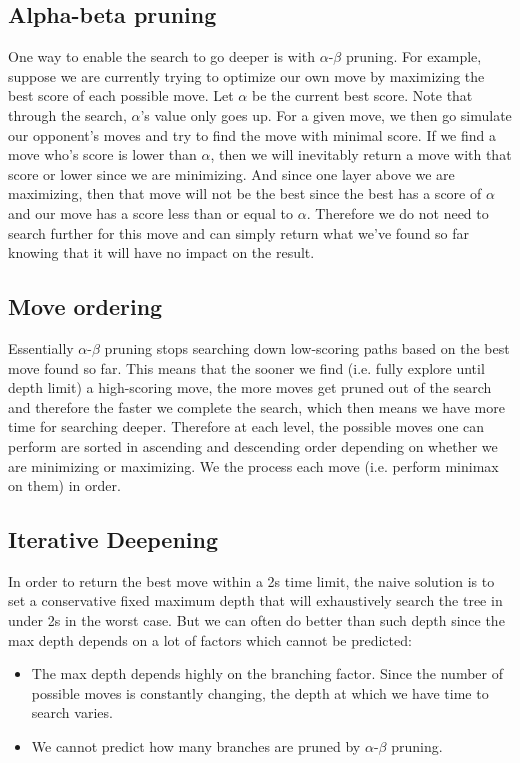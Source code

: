 \documentclass{article}
\begin{document}
\subsection{Alpha-beta pruning}
One way to enable the search to go deeper is with $\alpha$-$\beta$ pruning. For example, suppose we are currently trying to optimize our own move by maximizing the best score of each possible move. Let $\alpha$ be the current best score. Note that through the search, $\alpha$'s value only goes up. For a given move, we then go simulate our opponent's moves and try to find the move with minimal score. If we find a move who's score is lower than $\alpha$, then we will inevitably return a move with that score or lower since we are minimizing. And since one layer above we are maximizing, then that move will not be the best since the best has a score of $\alpha$ and our move has a score less than or equal to $\alpha$. Therefore we do not need to search further for this move and can simply return what we've found so far knowing that it will have no impact on the result.

\subsection{Move ordering}
Essentially $\alpha$-$\beta$ pruning stops searching down low-scoring paths based on the best move found so far. This means that the sooner we find (i.e. fully explore until depth limit) a high-scoring move, the more moves get pruned out of the search and therefore the faster we complete the search, which then means we have more time for searching deeper. Therefore at each level, the possible moves one can perform are sorted in ascending and descending order depending on whether we are minimizing or maximizing. We the process each move (i.e. perform minimax on them) in order.

\subsection{Iterative Deepening}
In order to return the best move within a 2s time limit, the naive solution is to set a conservative fixed maximum depth that will exhaustively search the tree in under 2s in the worst case. But we can often do better than such depth since the max depth depends on a lot of factors which cannot be predicted:
\begin{itemize}
\item The max depth depends highly on the branching factor. Since the number of possible moves is constantly changing, the depth at which we have time to search varies.
\item We cannot predict how many branches are pruned by $\alpha$-$\beta$ pruning.
\end{itemize}
\end{document}
